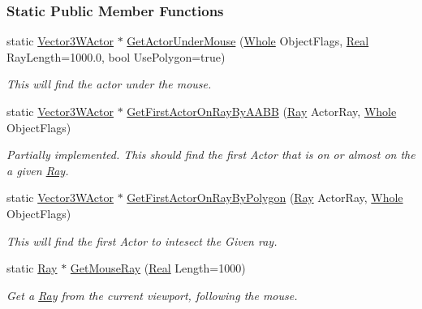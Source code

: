 \subsubsection*{Static Public Member Functions}
\begin{DoxyCompactItemize}
\item 
static \hyperlink{classphys_1_1Vector3WActor}{Vector3WActor} $\ast$ \hyperlink{classphys_1_1RayQueryTool_a15b961426b667f9b9cbec9dd0d72c2b1}{GetActorUnderMouse} (\hyperlink{namespacephys_a460f6bc24c8dd347b05e0366ae34f34a}{Whole} ObjectFlags, \hyperlink{namespacephys_af7eb897198d265b8e868f45240230d5f}{Real} RayLength=1000.0, bool UsePolygon=true)
\begin{DoxyCompactList}\small\item\em This will find the actor under the mouse. \item\end{DoxyCompactList}\item 
static \hyperlink{classphys_1_1Vector3WActor}{Vector3WActor} $\ast$ \hyperlink{classphys_1_1RayQueryTool_af4bba2ed8f201d4b0e9a05728d8bd1b6}{GetFirstActorOnRayByAABB} (\hyperlink{classphys_1_1Ray}{Ray} ActorRay, \hyperlink{namespacephys_a460f6bc24c8dd347b05e0366ae34f34a}{Whole} ObjectFlags)
\begin{DoxyCompactList}\small\item\em Partially implemented. This should find the first Actor that is on or almost on the a given \hyperlink{classphys_1_1Ray}{Ray}. \item\end{DoxyCompactList}\item 
static \hyperlink{classphys_1_1Vector3WActor}{Vector3WActor} $\ast$ \hyperlink{classphys_1_1RayQueryTool_a89a45879ef765c569ca2b2f0a54f3dcd}{GetFirstActorOnRayByPolygon} (\hyperlink{classphys_1_1Ray}{Ray} ActorRay, \hyperlink{namespacephys_a460f6bc24c8dd347b05e0366ae34f34a}{Whole} ObjectFlags)
\begin{DoxyCompactList}\small\item\em This will find the first Actor to intesect the Given ray. \item\end{DoxyCompactList}\item 
static \hyperlink{classphys_1_1Ray}{Ray} $\ast$ \hyperlink{classphys_1_1RayQueryTool_a33d1350b7ce016b2b1c5a6ef329eb193}{GetMouseRay} (\hyperlink{namespacephys_af7eb897198d265b8e868f45240230d5f}{Real} Length=1000)
\begin{DoxyCompactList}\small\item\em Get a \hyperlink{classphys_1_1Ray}{Ray} from the current viewport, following the mouse. \item\end{DoxyCompactList}\item 

\end{DoxyCompactItemize}
